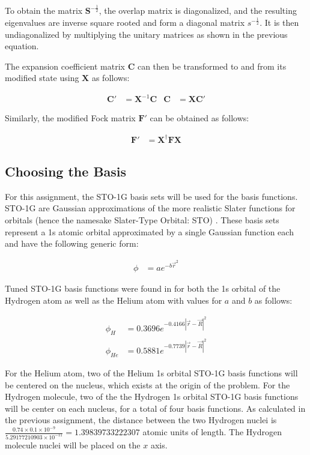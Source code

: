 \documentclass[10pt, oneside, letterpaper]{article}
\begin{document}
To obtain the matrix $\bm{S}^{-\frac{1}{2}}$, the overlap matrix is diagonalized, and the resulting eigenvalues are inverse square rooted and form a diagonal matrix $s^{-\frac{1}{2}}$. It is then undiagonalized by multiplying the unitary matrices as shown in the previous equation.

The expansion coefficient matrix $\bm{C}$ can then be transformed to and from its modified state using $\bm{X}$ as follows:

\begin{align*}
\bm{C}' &= \bm{X}^{-1}\bm{C} & \bm{C} &= \bm{X}\bm{C}'
\end{align*}

Similarly, the modified Fock matrix $\bm{F}'$ can be obtained as follows:

\begin{align*}
\bm{F}' &= \bm{X}^\dagger\bm{F}\bm{X}
\end{align*}

\subsection{Choosing the Basis}

For this assignment, the STO-1G basis sets will be used for the basis functions. STO-1G are Gaussian approximations of the more realistic Slater functions for orbitals (hence the namesake Slater-Type Orbital: STO) \cite{chem-libretext-gaussian-basis-sets}. These basis sets represent a 1s atomic orbital approximated by a single Gaussian function each and have the following generic form:

\begin{align*}
\phi &= ae^{-b\vec{r}^2}
\end{align*}

Tuned STO-1G basis functions were found in \cite[p.~214]{errol-comp-chem-text}\cite{hartree-fock-in-100-lines} for both the 1s orbital of the Hydrogen atom as well as the Helium atom with values for $a$ and $b$ as follows:

\begin{align*}
\phi_{H} &= 0.3696e^{-0.4166\left|\vec{r} - \vec{R}\right|^2} \\
\phi_{He} &= 0.5881e^{-0.7739\left|\vec{r} - \vec{R}\right|^2}
\end{align*}

For the Helium atom, two of the Helium 1s orbital STO-1G basis functions will be centered on the nucleus, which exists at the origin of the problem. For the Hydrogen molecule, two of the the Hydrogen 1s orbital STO-1G basis functions will be center on each nucleus, for a total of four basis functions. As calculated in the previous assignment, the distance between the two Hydrogen nuclei is $\frac{0.74 \times 0.1\times10^{-9}}{5.29177210903\times10^{-11}} = 1.39839733222307$ atomic units of length. The Hydrogen molecule nuclei will be placed on the $x$ axis.
\end{document}
